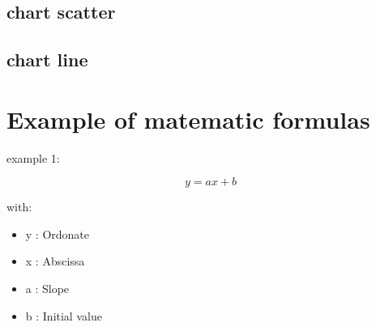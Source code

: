 \documentclass[reprint, floatfix, groupaddress, prb]{article}
\providecommand{\tightlist}{%
      \setlength{\itemsep}{0pt}\setlength{\parskip}{0pt}}
\begin{document}
        
    \begin{figure}
        \begin{center}\end{center}
        \caption{}
        \label{}
    \end{figure}
    
    
    \hypertarget{chart-scatter}{%
\subsection{chart scatter}\label{chart-scatter}}

        
    \begin{figure}
        \begin{center}\end{center}
        \caption{}
        \label{}
    \end{figure}
    
    
    \hypertarget{chart-line}{%
\subsection{chart line}\label{chart-line}}

        
    \begin{figure}
        \begin{center}\end{center}
        \caption{}
        \label{}
    \end{figure}
    
    
    \hypertarget{example-of-matematic-formulas}{%
\section{Example of matematic
formulas}\label{example-of-matematic-formulas}}

    example 1:

\[ y = a x + b \]

with:

\begin{itemize}
\tightlist
\item
  y : Ordonate
\item
  x : Abscissa
\item
  a : Slope
\item
  b : Initial value
\end{itemize}
\end{document}
